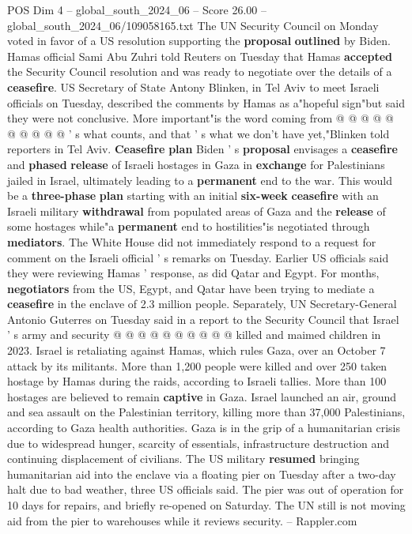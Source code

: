 \begin{textsample}{POS Dim 4 – global\_south\_2024\_06 – Score 26.00 – global\_south\_2024\_06/109058165.txt}
The UN Security Council on Monday voted in favor of a US resolution supporting the \textbf{proposal} \textbf{outlined} by Biden.
Hamas official Sami Abu Zuhri told Reuters on Tuesday that Hamas \textbf{accepted} the Security Council resolution and was ready to negotiate over the details of a \textbf{ceasefire}.
US Secretary of State Antony Blinken, in Tel Aviv to meet Israeli officials on Tuesday, described the comments by Hamas as a"hopeful sign"but said they were not conclusive.
More important"is the word coming from @ @ @ @ @ @ @ @ @ @ ' s what counts, and that ' s what we don't have yet,"Blinken told reporters in Tel Aviv. \textbf{Ceasefire} \textbf{plan} Biden ' s \textbf{proposal} envisages a \textbf{ceasefire} and \textbf{phased} \textbf{release} of Israeli hostages in Gaza in \textbf{exchange} for Palestinians jailed in Israel, ultimately leading to a \textbf{permanent} end to the war.
This would be a \textbf{three-phase} \textbf{plan} starting with an initial \textbf{six-week} \textbf{ceasefire} with an Israeli military \textbf{withdrawal} from populated areas of Gaza and the \textbf{release} of some hostages while"a \textbf{permanent} end to hostilities"is negotiated through \textbf{mediators}.
The White House did not immediately respond to a request for comment on the Israeli official ' s remarks on Tuesday.
Earlier US officials said they were reviewing Hamas ' response, as did Qatar and Egypt.
For months, \textbf{negotiators} from the US, Egypt, and Qatar have been trying to mediate a \textbf{ceasefire} in the enclave of 2.3 million people.
Separately, UN Secretary-General Antonio Guterres on Tuesday said in a report to the Security Council that Israel ' s army and security @ @ @ @ @ @ @ @ @ @ killed and maimed children in 2023.
Israel is retaliating against Hamas, which rules Gaza, over an October 7 attack by its militants.
More than 1,200 people were killed and over 250 taken hostage by Hamas during the raids, according to Israeli tallies.
More than 100 hostages are believed to remain \textbf{captive} in Gaza.
Israel launched an air, ground and sea assault on the Palestinian territory, killing more than 37,000 Palestinians, according to Gaza health authorities.
Gaza is in the grip of a humanitarian crisis due to widespread hunger, scarcity of essentials, infrastructure destruction and continuing displacement of civilians.
The US military \textbf{resumed} bringing humanitarian aid into the enclave via a floating pier on Tuesday after a two-day halt due to bad weather, three US officials said.
The pier was out of operation for 10 days for repairs, and briefly re-opened on Saturday.
The UN still is not moving aid from the pier to warehouses while it reviews security. -- Rappler.com

\end{textsample}
